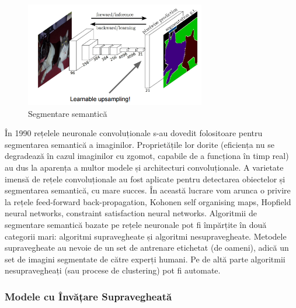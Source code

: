 \begin{figure}[h!]
    	\centering
	\captionsetup{justification=centering, margin=2cm}
	\includegraphics[width=0.7\textwidth]{figures/img_seg_ful_conv.png}
	\caption{Segmentare semantică \cite{rcnn_vs_fast_rcnn}}
	\label{fig:class_detect_segment}
\end{figure}

În 1990 rețelele neuronale convoluționale s-au dovedit folositoare pentru segmentarea semantică a imaginilor. Proprietățile lor dorite (eficiența nu se degradează în cazul imaginilor cu zgomot, capabile de a funcționa în timp real) au dus la aparența a multor modele și architecturi convoluționale. A varietate imensă de rețele convoluționale au fost aplicate pentru detectarea obiectelor și segmentarea semantică, cu mare succes. În această lucrare vom arunca o privire la rețele feed-forward back-propagation, Kohonen self organising maps, Hopfield neural networks, constraint satisfaction neural networks.\newline
Algoritmii de segmentare semantică bazate pe rețele neuronale pot fi împărțite în două categorii mari: algoritmi supravegheate și algoritmi nesupravegheate. Metodele supravegheate au nevoie de un set de antrenare etichetat (de oameni), adică un set de imagini segmentate de către experți humani. Pe de altă parte algoritmii nesupravegheați (sau procese de clustering) pot fi automate.

\subsubsection{Modele cu Învățare Supravegheată}













